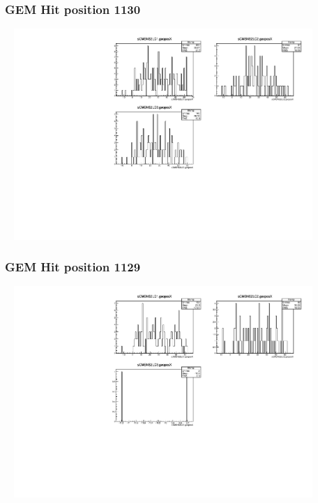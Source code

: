 \documentclass[slidestop,compress,mathserif]{beamer}
\begin{document}
\begin{frame}\frametitle{GEM Hit position 1130}
	 \includegraphics[width=12cm,height=8cm]{GEM_Hit_position_1130.pdf}
\end{frame}
\begin{frame}\frametitle{GEM Hit position 1129}
	 \includegraphics[width=12cm,height=8cm]{GEM_Hit_position_1129.pdf}
\end{frame}
\end{document}

